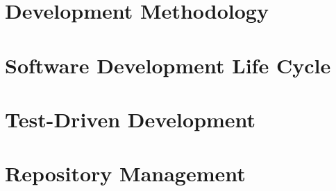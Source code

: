 \section{Development Methodology}


\section{Software Development Life Cycle}


\section{Test-Driven Development}


\section{Repository Management}